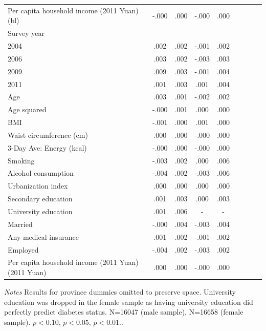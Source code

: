 \begin{table}[p]
\begin{center}
\begin{adjustbox}{max width=\linewidth}
\begin{threeparttable}
{\begin{tabular}{l*{4}{S S}}
Per capita household income (2011 Yuan) (bl)&-.000 &.000         &-.000 &.000         \\
Survey year && \\
\hspace*{10mm}2004&.002 &.002         &-.001 &.002         \\
\hspace*{10mm}2006&.003 &.002         &-.003 &.003         \\
\hspace*{10mm}2009&.009\sym{***} &.003         &-.001 &.004         \\
\hspace*{10mm}2011&.001 &.003         &.001 &.004         \\
Age           &.003\sym{**} &.001         &-.002 &.002         \\
Age squared        &-.000\sym{**} &.001         &.000 &.000         \\
BMI          &-.001 &.000        &.001\sym{**} &.000         \\
Waist circumference (cm)         &.000 &.000         &-.000 &.000         \\
3-Day Ave: Energy (kcal)        &-.000 &.000         &-.000 &.000         \\
Smoking         &-.003 &.002         &.000 &.006         \\
Alcohol consumption        &-.004\sym{**} &.002         &-.003 &.006         \\
Urbanization index         &.000 &.000         &.000 &.000         \\
Secondary education     &.001 &.003         &.000 &.003         \\
University education    &.001 &.006         & - & -         \\
Married       &-.000 &.004         &-.003 &.004         \\
Any medical insurance     &.001 &.002         &-.001 &.002         \\
Employed         &-.004\sym{**} &.002         &-.003 &.002         \\
Per capita household income (2011 Yuan) (2011 Yuan) &.000 &.000         &-.000 &.000         \\
\bottomrule
\end{tabular}
\begin{tablenotes}
\item \textit{Notes} Results for province dummies omitted to preserve space. University education was dropped in the female sample as having university education did perfectly predict diabetes status. N=16047 (male sample), N=16658 (female sample). \sym{*} \(p<0.10\), \sym{**} \(p<0.05\), \sym{***} \(p<0.01\).. \\
\end{tablenotes}
}
\end{threeparttable}

\end{adjustbox}
\end{center}
\end{table}




